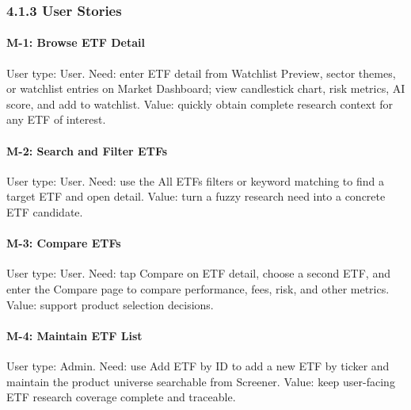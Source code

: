 \subsubsection{4.1.3 User Stories}

\paragraph{M-1: Browse ETF Detail}

User type: User. Need: enter ETF detail from Watchlist Preview, sector themes, or watchlist entries on Market Dashboard; view candlestick chart, risk metrics, AI score, and add to watchlist. Value: quickly obtain complete research context for any ETF of interest.


\paragraph{M-2: Search and Filter ETFs}

User type: User. Need: use the All ETFs filters or keyword matching to find a target ETF and open detail. Value: turn a fuzzy research need into a concrete ETF candidate.


\paragraph{M-3: Compare ETFs}

User type: User. Need: tap Compare on ETF detail, choose a second ETF, and enter the Compare page to compare performance, fees, risk, and other metrics. Value: support product selection decisions.


\paragraph{M-4: Maintain ETF List}

User type: Admin. Need: use Add ETF by ID to add a new ETF by ticker and maintain the product universe searchable from Screener. Value: keep user-facing ETF research coverage complete and traceable.


